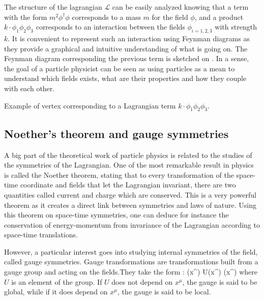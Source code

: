     The structure of the lagrangian $\mathcal{L}$ can be easily analyzed knowing that
    a term with the form $m^2 \phi^\dagger \phi$ corresponds to a mass $m$ for the field $\phi$,
    and a product $k \cdot \phi_1 \phi_2 \phi_3$ corresponds to an interaction
    between the fields $\phi_{i=1,2,3}$ with strength $k$. It is convenient to
    represent such an interaction using Feynman diagrams as they provide a graphical and
    intuitive understanding of what is going on. The Feynman diagram corresponding the
    previous term is sketched on . In a sense, the
    goal of a particle physicist can be seen as using particles as a mean to understand
    which fields exists, what are their properties and how they couple with each other.

                 {Example of vertex corresponding to a Lagrangian term
                 $k \cdot \phi_1 \phi_2 \phi_3$.}

        \subsection{Noether's theorem and gauge symmetries}

    A big part of the theoretical work of particle physics is related to the studies of
    the symmetries of the Lagrangian. One of the most remarkable result in physics is
    called the Noether theorem, stating that to every transformation of the space-time
    coordinate and fields that let the Lagrangian invariant, there are two quantities
    called current and charge which are conserved. This is a very powerful theorem as it
    creates a direct link between symmetries and laws of nature. Using this theorem on
    space-time symmetries, one can deduce for instance the conservation of energy-momentum
    from invariance of the Lagrangian according to space-time translations.

    However, a particular interest goes into studying internal symmetries of the field,
    called gauge symmetries. Gauge transformations are transformations built from a gauge
    group and acting on the fields.They take the form :
    {
        \psi(x^\mu)
        \rightarrow
        U(x^\mu) \psi(x^\mu)
    }
    where $U$ is an element of the group. If $U$ does not depend on $x^\mu$, the gauge is
    said to be global, while if it does depend on $x^\mu$, the gauge is said to be local.


